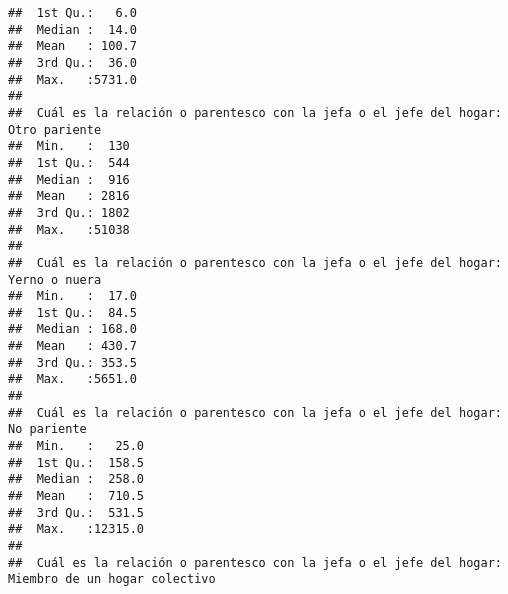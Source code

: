 \documentclass[11pt,]{article}
\begin{document}
\begin{verbatim}
##  1st Qu.:   6.0                                                                              
##  Median :  14.0                                                                              
##  Mean   : 100.7                                                                              
##  3rd Qu.:  36.0                                                                              
##  Max.   :5731.0                                                                              
##                                                                                              
##  Cuál es la relación o parentesco con la jefa o el jefe del hogar: Otro pariente
##  Min.   :  130                                                                  
##  1st Qu.:  544                                                                  
##  Median :  916                                                                  
##  Mean   : 2816                                                                  
##  3rd Qu.: 1802                                                                  
##  Max.   :51038                                                                  
##                                                                                 
##  Cuál es la relación o parentesco con la jefa o el jefe del hogar: Yerno o nuera
##  Min.   :  17.0                                                                 
##  1st Qu.:  84.5                                                                 
##  Median : 168.0                                                                 
##  Mean   : 430.7                                                                 
##  3rd Qu.: 353.5                                                                 
##  Max.   :5651.0                                                                 
##                                                                                 
##  Cuál es la relación o parentesco con la jefa o el jefe del hogar: No pariente
##  Min.   :   25.0                                                              
##  1st Qu.:  158.5                                                              
##  Median :  258.0                                                              
##  Mean   :  710.5                                                              
##  3rd Qu.:  531.5                                                              
##  Max.   :12315.0                                                              
##                                                                               
##  Cuál es la relación o parentesco con la jefa o el jefe del hogar: Miembro de un hogar colectivo

\end{verbatim}
\end{document}
